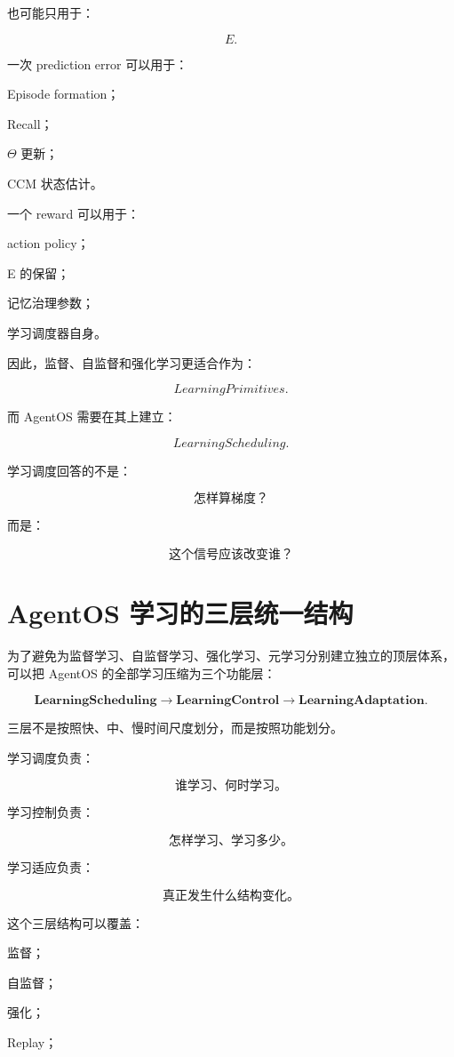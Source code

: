 也可能只用于：

\[
E.
\]

一次 prediction error 可以用于：

Episode formation；

Recall；

\(\Theta\) 更新；

CCM 状态估计。

一个 reward 可以用于：

action policy；

E 的保留；

记忆治理参数；

学习调度器自身。

因此，监督、自监督和强化学习更适合作为：

\[
\boxed{
LearningPrimitives.
}
\]

而 AgentOS 需要在其上建立：

\[
\boxed{
LearningScheduling.
}
\]

学习调度回答的不是：

\[
\boxed{
\text{怎样算梯度？}
}
\]

而是：

\[
\boxed{
\text{这个信号应该改变谁？}
}
\]


\section{AgentOS 学习的三层统一结构}

为了避免为监督学习、自监督学习、强化学习、元学习分别建立独立的顶层体系，可以把 AgentOS 的全部学习压缩为三个功能层：

\[
\boxed{
\textbf{LearningScheduling}
\rightarrow
\textbf{LearningControl}
\rightarrow
\textbf{LearningAdaptation}.
}
\]

三层不是按照快、中、慢时间尺度划分，而是按照功能划分。

学习调度负责：

\[
\boxed{
\text{谁学习、何时学习。}
}
\]

学习控制负责：

\[
\boxed{
\text{怎样学习、学习多少。}
}
\]

学习适应负责：

\[
\boxed{
\text{真正发生什么结构变化。}
}
\]

这个三层结构可以覆盖：

监督；

自监督；

强化；

Replay；

